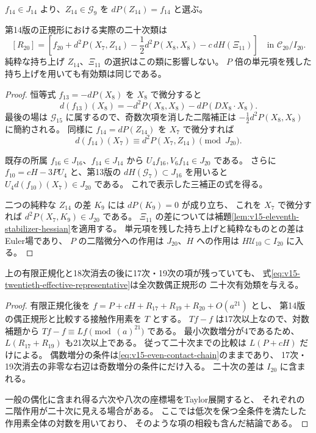 $f_{14}\in J_{14}$ より、$Z_{14}\in\mathcal G_9$ を
$dP(Z_{14})=f_{14}$ と選ぶ。

\begin{theorem}[実際の二十次類の代表元]
\label{thm:v15-twentieth-effective-representative}
第14版の正規形における実際の二十次類は
\begin{equation}\label{eq:v15-twentieth-effective-representative}
 \boxed{\displaystyle
 [R_{20}]=\left[f_{20}+d^2P(X_7,Z_{14})
       -\frac12d^2P(X_8,X_8)-c\,dH(\Xi_{11})\right]
       \quad\text{in }\mathcal C_{20}/I_{20}.
 }
\end{equation}
純粋な持ち上げ $Z_{14}$、$\Xi_{11}$ の選択はこの類に影響しない。
$P$ 倍の単元項を残した持ち上げを用いても有効類は同じである。
\end{theorem}

\begin{proof}
恒等式 $f_{13}=-dP(X_8)$ を $X_8$ で微分すると
\[
 d(f_{13})(X_8)=-d^2P(X_8,X_8)-dP(DX_8\cdot X_8).
\]
最後の場は $\mathcal G_{15}$ に属するので、奇数次項を消した二階補正は
$-\tfrac12d^2P(X_8,X_8)$ に簡約される。
同様に $f_{14}=dP(Z_{14})$ を $X_7$ で微分すれば
\[
 d(f_{14})(X_7)\equiv d^2P(X_7,Z_{14})\pmod{J_{20}}.
\]

既存の所属 $f_{16}\in J_{16}$、$f_{14}\in J_{14}$ から
$U_4f_{16},V_6f_{14}\in J_{20}$ である。
さらに $f_{10}=cH-3PU_4$ と、第13版の
$dH(\mathcal G_7)\subset J_{16}$ を用いると
$U_4d(f_{10})(X_7)\in J_{20}$ である。
これで表示した三補正の式を得る。

二つの純粋な $Z_{14}$ の差 $K_9$ には $dP(K_9)=0$ が成り立ち、
これを $X_7$ で微分すれば $d^2P(X_7,K_9)\in J_{20}$ である。
$\Xi_{11}$ の差については補題\ref{lem:v15-eleventh-stabilizer-hessian}を適用する。
単元項を残した持ち上げと純粋なものとの差はEuler場であり、
$P$ の二階微分への作用は $J_{20}$、$H$ への作用は
$H\mathcal U_{10}\subset I_{20}$ に入る。
\end{proof}

\begin{corollary}
\label{cor:v15-twentieth-without-odd-normalizers}
上の有限正規化と18次消去の後に17次・19次の項が残っていても、
式\eqref{eq:v15-twentieth-effective-representative}は全次数偶正規形の
二十次有効類を与える。
\end{corollary}

\begin{proof}
有限正規化後を $f=P+cH+R_{17}+R_{19}+R_{20}+O(a^{21})$ とし、
第14版の偶正規形と比較する接触作用素を $T$ とする。
$Tf-f$ は17次以上なので、対数補題から
$Tf-f\equiv Lf\pmod{(a)^{21}}$ である。
最小次数増分が4であるため、$L(R_{17}+R_{19})$ も21次以上である。
従って二十次までの比較は $L(P+cH)$ だけによる。
偶数増分の条件は\eqref{eq:v15-even-contact-chain}のままであり、
17次・19次消去の非零な右辺は奇数増分の条件にだけ入る。
二十次の差は $I_{20}$ に含まれる。

一般の偶化に含まれ得る六次や八次の座標場をTaylor展開すると、
それぞれの二階作用が二十次に見える場合がある。
ここでは低次を保つ全条件を満たした作用素全体の対数を用いており、
そのような項の相殺も含んだ結論である。
\end{proof}


